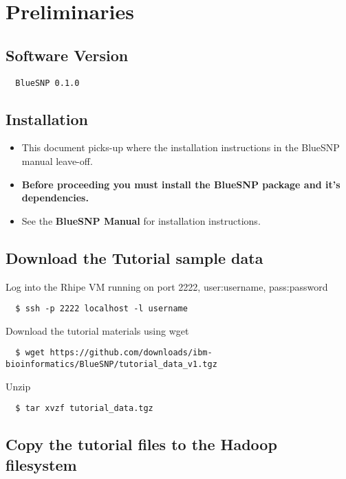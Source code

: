 \section{Preliminaries}

\subsection{Software Version}

\begin{verbatim}
  BlueSNP 0.1.0
\end{verbatim}

\subsection{Installation}

\begin{itemize}
\item This document picks-up where the installation instructions in the BlueSNP manual leave-off. 
\item \textbf{Before proceeding you must install the BlueSNP package and it's dependencies.} \item See the \textbf{BlueSNP Manual} for installation instructions.
\end{itemize}

\subsection{Download the Tutorial sample data}

Log into the Rhipe VM running on port 2222, user:username, pass:password
\begin{verbatim}
  $ ssh -p 2222 localhost -l username
\end{verbatim}

Download the tutorial materials using wget 
\begin{verbatim}
  $ wget https://github.com/downloads/ibm-bioinformatics/BlueSNP/tutorial_data_v1.tgz
\end{verbatim}

Unzip
\begin{verbatim}
  $ tar xvzf tutorial_data.tgz
\end{verbatim}

\subsection{Copy the tutorial files to the Hadoop filesystem}

